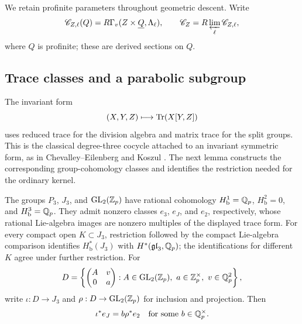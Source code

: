 We retain profinite parameters throughout geometric descent.  Write
\[
 \mathscr C_{Z,\ell}(Q)
   =R\Gamma_v(Z\times\underline Q,\Lambda_\ell),\qquad
 \mathscr C_Z=R\varprojlim_\ell\mathscr C_{Z,\ell},
\]
where $Q$ is profinite; these are derived sections on $Q$.

\subsection{Trace classes and a parabolic subgroup}

The invariant form
\[
 (X,Y,Z)\longmapsto\operatorname{Tr}(X[Y,Z])
\]
uses reduced trace for the division algebra and matrix trace for the
split groups.  This is the classical degree-three cocycle attached to
an invariant symmetric form, as in Chevalley--Eilenberg
\cite[Section~21]{ChevalleyEilenberg1948} and Koszul
\cite[Section~11]{Koszul1950}.
The next lemma constructs the corresponding group-cohomology classes
and identifies the restriction needed for the ordinary kernel.

\begin{lemma}\label{h3:rat:trace-groups}
The groups $P_3$, $J_3$, and $\operatorname{GL}_2(\mathbb Z_p)$ have rational cohomology
$H^1_{\mathrm b}=\mathbb Q_p$, $H^2_{\mathrm b}=0$, and
$H^3_{\mathrm b}=\mathbb Q_p$.  They admit nonzero classes
$e_3$, $e_J$, and $e_2$, respectively, whose rational Lie-algebra
images are nonzero multiples of the displayed trace form.
For every compact open $K\subset J_3$, restriction followed by
the compact Lie-algebra comparison identifies $H^*_{\mathrm b}(J_3)$
with $H^*(\mathfrak{gl}_3,\mathbb Q_p)$; the identifications for different
$K$ agree under further restriction.  For
\[
 D=\left\{\begin{pmatrix}A&v\\0&a\end{pmatrix}:
 A\in\operatorname{GL}_2(\mathbb Z_p),\ a\in\mathbb Z_p^\times,\ v\in\mathbb Q_p^2\right\},
\]
write $\iota:D\to J_3$ and $\rho:D\to\operatorname{GL}_2(\mathbb Z_p)$ for
inclusion and projection.  Then
\begin{equation}\label{h3:eq:rat-parabolic-trace}
 \iota^*e_J=b\rho^*e_2\quad\text{for some }b\in\mathbb Q_p^\times.
\end{equation}
\end{lemma}

